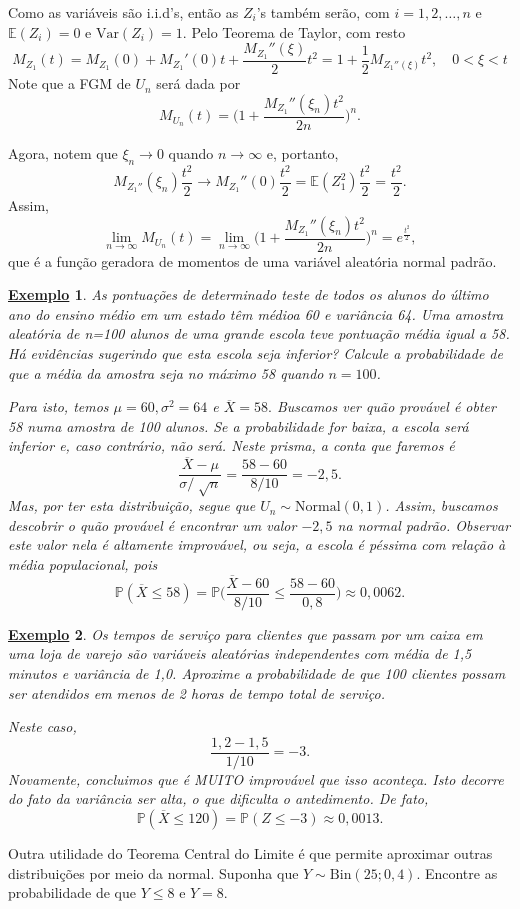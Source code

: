 \documentclass{article}
\newtheorem{example}{\underline{Exemplo}}
\begin{document}
  Como as variáveis são i.i.d's, então as \(Z_{i}\)'s também serão, com \(i=1, 2, \dotsc , n\) e \(\mathbb{E}(Z_{i}) = 0\) e \(\mathrm{Var}(Z_{i}) = 1.\)
Pelo Teorema de Taylor, com resto 
  \[
    M_{Z_{1}}(t) = M_{Z_{1}}(0) + M_{Z_1}'(0)t + \frac{M_{Z_{1}}''(\xi)}{2}t^{2} = 1 + \frac{1}{2}M_{Z_{1}''(\xi)}t^{2},\quad 0 < \xi < t
  \]
  Note que a FGM de \(U_{n}\) será dada por 
    \[
      M_{U_{n}}(t) = \biggl(1 + \frac{M_{Z_{1}}''(\xi_{n})t^{2}}{2n}\biggr)^{n}.
    \] 

  Agora, notem que \(\xi_{n}\to 0 \) quando \(n\to \infty\) e, portanto, 
    \[
      M_{Z_{1}''}(\xi_{n})\frac{t^{2}}{2}\to M_{Z_{1}}''(0)\frac{t^{2}}{2} = \mathbb{E}(Z_{1}^{2})\frac{t^{2}}{2} = \frac{t^{2}}{2}.
    \]
  Assim, 
    \[
    \lim_{n\to \infty}M_{U_{n}}(t) = \lim_{n\to \infty}\biggl(1 + \frac{M_{Z_{1}}''(\xi_{n})t^{2}}{2n}\biggr)^{n} = e^{\frac{t^{2}}{2}},
    \]
  que é a função geradora de momentos de uma variável aleatória normal padrão.
 \begin{example}
  As pontuações de determinado teste de todos os alunos do último ano do ensino médio em um estado têm médioa 60 e variância 64. Uma amostra aleatória de n=100 alunos de uma grande
escola teve pontuação média igual a 58. Há evidências sugerindo que esta escola seja inferior? Calcule a probabilidade de que a média da amostra seja no máximo 58 quando \(n = 100\).

  Para isto, temos \(\mu = 60, \sigma ^{2} = 64\) e \(\overline{X} = 58.\) Buscamos ver quão provável é obter 58 numa amostra de 100 alunos. Se a probabilidade for baixa,
a escola será inferior e, caso contrário, não será. Neste prisma, a conta que faremos é 
  \[
    \frac{\overline{X} - \mu }{\sigma/\sqrt[]{n}} = \frac{58 - 60}{8/10} = -2,5.
  \]
  Mas, por ter esta distribuição, segue que \(U_{n}\sim \mathrm{Normal}(0, 1)\). Assim, buscamos descobrir o quão provável é encontrar um valor
 \(-2,5\) na normal padrão. Observar este valor nela é altamente improvável, ou seja, a escola é péssima com relação à média populacional, pois 
   \[
     \mathbb{P}(\overline{X}\leq 58) = \mathbb{P}\biggl(\frac{\overline{X}-60}{8/10} \leq \frac{58 - 60}{0,8}\biggr)\approx 0,0062.
   \]
 \end{example}
 \begin{example}
  Os tempos de serviço para clientes que passam por um caixa em uma loja de varejo são variáveis aleatórias independentes com média de 1,5 minutos e variância de 1,0.
Aproxime a probabilidade de que 100 clientes possam ser atendidos em menos de 2 horas de tempo total de serviço.
  
  Neste caso, 
    \[
      \frac{1,2 - 1,5}{1/10} = -3.
    \]
  Novamente, concluimos que é MUITO improvável que isso aconteça. Isto decorre do fato da variância ser alta, o que dificulta o antedimento. De fato, 
    \[
      \mathbb{P}(\overline{X} \leq 120) = \mathbb{P}(Z\leq -3)\approx 0,0013.
    \]
 \end{example}
  Outra utilidade do Teorema Central do Limite é que permite aproximar outras distribuições por meio da normal.
   Suponha que \(Y\sim \mathrm{Bin}(25; 0,4)\). Encontre as probabilidade de que \(Y\leq 8\) e \(Y = 8\). 
\newpage 
\end{document}
